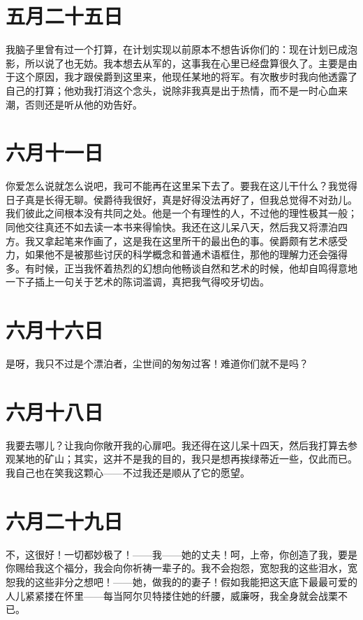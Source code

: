 \documentclass[12pt,oneside]{book}
\begin{document}
\chapter{五月二十五日}
\label{sec-4-4}
我脑子里曾有过一个打算，在计划实现以前原本不想告诉你们的：现在计划已成泡影，所以说了也无妨。我本想去从军的，这事我在心里已经盘算很久了。主要是由于这个原因，我才跟侯爵到这里来，他现任某地的将军。有次散步时我向他透露了自己的打算；他劝我打消这个念头，说除非我真是出于热情，而不是一时心血来潮，否则还是听从他的劝告好。
　　

\chapter{六月十一日}
\label{sec-4-5}
你爱怎么说就怎么说吧，我可不能再在这里呆下去了。要我在这儿干什么？我觉得日子真是长得无聊。侯爵待我很好，真是好得没法再好了，但我总觉得不对劲儿。我们彼此之间根本没有共同之处。他是一个有理性的人，不过他的理性极其一般；同他交往真还不如去读一本书来得愉快。我还在这儿呆八天，然后我又将漂泊四方。我又拿起笔来作画了，这是我在这里所干的最出色的事。侯爵颇有艺术感受力，如果他不是被那些讨厌的科学概念和普通术语框住，那他的理解力还会强得多。有时候，正当我怀着热烈的幻想向他畅谈自然和艺术的时候，他却自鸣得意地一下子插上一句关于艺术的陈词滥调，真把我气得咬牙切齿。
　　

\chapter{六月十六日}
\label{sec-4-6}
是呀，我只不过是个漂泊者，尘世间的匆匆过客！难道你们就不是吗？
　　

\chapter{六月十八日}
\label{sec-4-7}
我要去哪儿？让我向你敞开我的心扉吧。我还得在这儿呆十四天，然后我打算去参观某地的矿山；其实，这并不是我的目的，我只是想再挨绿蒂近一些，仅此而已。我自己也在笑我这颗心——不过我还是顺从了它的愿望。
　　

\chapter{六月二十九日}
\label{sec-4-8}
不，这很好！一切都妙极了！——我——她的丈夫！呵，上帝，你创造了我，要是你赐给我这个福分，我会向你祈祷一辈子的。我不会抱怨，宽恕我的这些泪水，宽恕我的这些非分之想吧！——她，做我的的妻子！假如我能把这天底下最最可爱的人儿紧紧搂在怀里——每当阿尔贝特搂住她的纤腰，威廉呀，我全身就会战栗不已。
\end{document}
